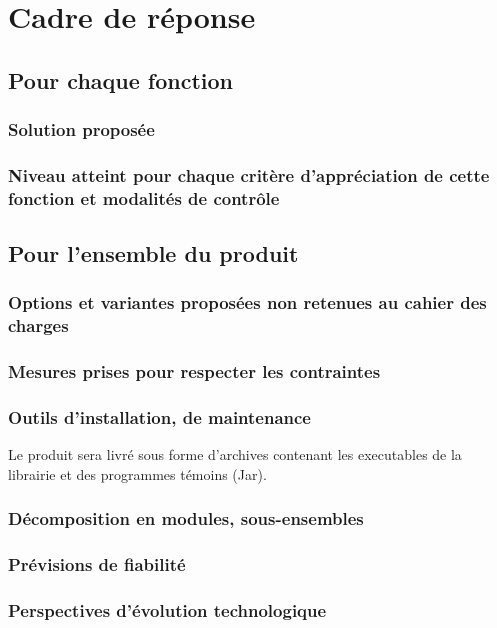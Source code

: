 \section{Cadre de réponse}

\subsection{Pour chaque fonction}

\subsubsection{Solution proposée}
\subsubsection{Niveau atteint pour chaque critère d’appréciation de cette fonction et modalités de contrôle}


\subsection{Pour l’ensemble du produit}

\subsubsection{Options et variantes proposées non retenues au cahier des charges}
\subsubsection{Mesures prises pour respecter les contraintes}

\subsubsection{Outils d’installation, de maintenance}

Le produit sera livré sous forme d'archives contenant les executables de la librairie et des programmes témoins (Jar).


\subsubsection{Décomposition en modules, sous-ensembles}
\subsubsection{Prévisions de fiabilité}
\subsubsection{Perspectives d’évolution technologique}

